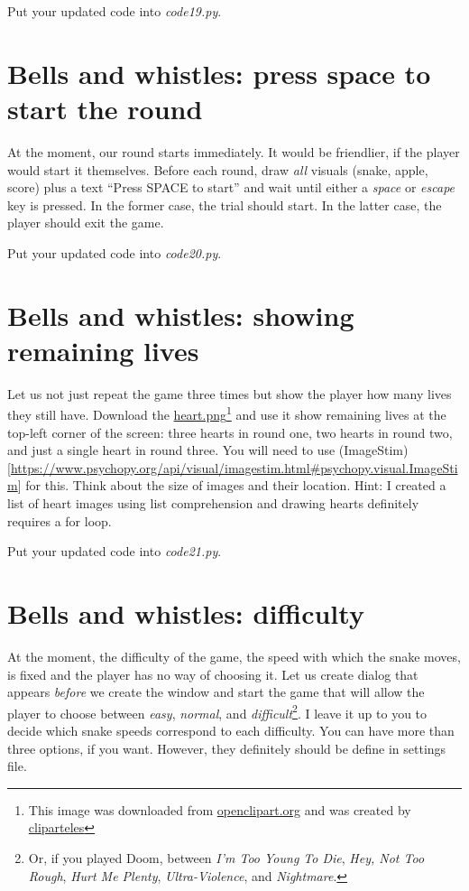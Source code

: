 \documentclass[
]{book}
\begin{document}
Put your updated code into \emph{code19.py}.

\hypertarget{bells-and-whistles-press-space-to-start-the-round}{%
\section{Bells and whistles: press space to start the round}\label{bells-and-whistles-press-space-to-start-the-round}}

At the moment, our round starts immediately. It would be friendlier, if the player would start it themselves. Before each round, draw \emph{all} visuals (snake, apple, score) plus a text ``Press SPACE to start'' and wait until either a \emph{space} or \emph{escape} key is pressed. In the former case, the trial should start. In the latter case, the player should exit the game.

Put your updated code into \emph{code20.py}.

\hypertarget{bells-and-whistles-showing-remaining-lives}{%
\section{Bells and whistles: showing remaining lives}\label{bells-and-whistles-showing-remaining-lives}}

Let us not just repeat the game three times but show the player how many lives they still have. Download the \href{material/heart.png}{heart.png}\footnote{This image was downloaded from \href{https://openclipart.org/}{openclipart.org} and was created by \href{https://openclipart.org/artist/cliparteles}{cliparteles}} and use it show remaining lives at the top-left corner of the screen: three hearts in round one, two hearts in round two, and just a single heart in round three. You will need to use (ImageStim){[}\url{https://www.psychopy.org/api/visual/imagestim.html\#psychopy.visual.ImageStim}{]} for this. Think about the size of images and their location. Hint: I created a list of heart images using list comprehension and drawing hearts definitely requires a for loop.

Put your updated code into \emph{code21.py}.

\hypertarget{bells-and-whistles-difficulty}{%
\section{Bells and whistles: difficulty}\label{bells-and-whistles-difficulty}}

At the moment, the difficulty of the game, the speed with which the snake moves, is fixed and the player has no way of choosing it. Let us create dialog that appears \emph{before} we create the window and start the game that will allow the player to choose between \emph{easy}, \emph{normal}, and \emph{difficult}\footnote{Or, if you played Doom, between \emph{I'm Too Young To Die}, \emph{Hey, Not Too Rough}, \emph{Hurt Me Plenty}, \emph{Ultra-Violence}, and \emph{Nightmare}.}. I leave it up to you to decide which snake speeds correspond to each difficulty. You can have more than three options, if you want. However, they definitely should be define in settings file.
\end{document}

